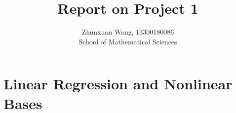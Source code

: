 \documentclass[10pt]{article}
\begin{document}
 
 
\title{\textbf{Report on Project 1}}%
\author{Zhunxuan Wang, 13300180086\\ %
School of Mathematical Sciences} %

\maketitle
\section{Linear Regression and Nonlinear Bases}
\end{document}
